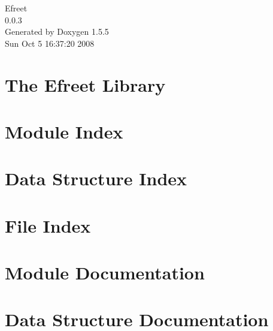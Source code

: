 \documentclass[a4paper]{book}
\begin{document}
\begin{titlepage}
\vspace*{7cm}
\begin{center}
{\Large Efreet \\[1ex]\large 0.0.3 }\\
\vspace*{1cm}
{\large Generated by Doxygen 1.5.5}\\
\vspace*{0.5cm}
{\small Sun Oct 5 16:37:20 2008}\\
\end{center}
\end{titlepage}
\clearemptydoublepage
{}
\tableofcontents
\clearemptydoublepage
{}
\chapter{The Efreet Library }
\label{index}
\chapter{Module Index}

\chapter{Data Structure Index}

\chapter{File Index}

\chapter{Module Documentation}








\chapter{Data Structure Documentation}































\end{document}

